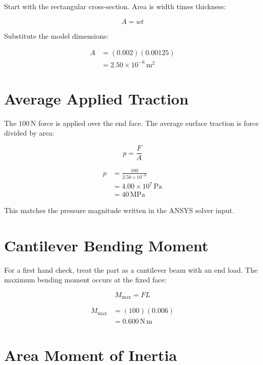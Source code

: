\documentclass[11pt]{article}
\newcommand{\unit}[1]{\,\mathrm{#1}}
\newcommand{\MPa}{\unit{MPa}}
\begin{document}
Start with the rectangular cross-section. Area is width times thickness:

\begin{equation}
A = w t
\end{equation}

Substitute the model dimensions:

\begin{align}
A &= (0.002)(0.00125) \\
  &= 2.50\times10^{-6}\unit{m^2}
\end{align}

\section{Average Applied Traction}

The $100\unit{N}$ force is applied over the end face. The average surface traction is force divided by area:

\begin{equation}
p = \frac{F}{A}
\end{equation}

\begin{align}
p &= \frac{100}{2.50\times10^{-6}} \\
  &= 4.00\times10^7\unit{Pa} \\
  &= 40\MPa
\end{align}

This matches the pressure magnitude written in the ANSYS solver input.

\section{Cantilever Bending Moment}

For a first hand check, treat the part as a cantilever beam with an end load. The maximum bending moment occurs at the fixed face:

\begin{equation}
M_{\max}=F L
\end{equation}

\begin{align}
M_{\max} &= (100)(0.006) \\
         &= 0.600\unit{N\,m}
\end{align}

\section{Area Moment of Inertia}
\end{document}
